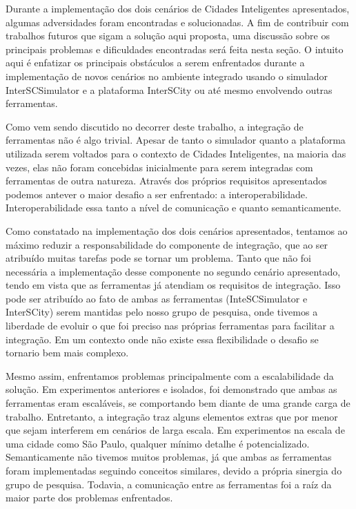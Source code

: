 Durante a implementação dos dois cenários de Cidades Inteligentes apresentados, algumas adversidades foram encontradas e solucionadas.
A fim de contribuir com trabalhos futuros que sigam a solução aqui proposta, uma discussão sobre os principais problemas e dificuldades encontradas será feita
nesta seção.
O intuito aqui é enfatizar os principais obstáculos a serem enfrentados durante a implementação de novos cenários no ambiente integrado usando o simulador InterSCSimulator e
a plataforma InterSCity ou até mesmo envolvendo outras ferramentas.

Como vem sendo discutido no decorrer deste trabalho, a integração de ferramentas não é algo trivial.
Apesar de tanto o simulador quanto a plataforma utilizada serem voltados para o contexto de Cidades Inteligentes, na maioria das vezes, elas não foram concebidas inicialmente
para serem integradas com ferramentas de outra natureza.
Através dos próprios requisitos apresentados podemos antever o maior desafio a ser enfrentado: a interoperabilidade.
Interoperabilidade essa tanto a nível de comunicação e quanto semanticamente.

Como constatado na implementação dos dois cenários apresentados, tentamos ao máximo reduzir a responsabilidade do componente de integração, que ao ser atribuído muitas
tarefas pode se tornar um problema.
Tanto que não foi necessária a implementação desse componente no segundo cenário apresentado, tendo em vista que as ferramentas já atendiam os requisitos de integração.
Isso pode ser atribuído ao fato de ambas as ferramentas (InteSCSimulator e InterSCity) serem mantidas pelo nosso grupo de pesquisa, onde tivemos a liberdade de evoluir o
que foi preciso nas próprias ferramentas para facilitar a integração.
Em um contexto onde não existe essa flexibilidade o desafio se tornario bem mais complexo.

Mesmo assim, enfrentamos problemas principalmente com a escalabilidade da solução.
Em experimentos anteriores e isolados, foi demonstrado que ambas as ferramentas eram escaláveis, se comportando bem diante de uma grande carga de trabalho.
Entretanto, a integração traz alguns elementos extras que por menor que sejam interferem em cenários de larga escala.
Em experimentos na escala de uma cidade como São Paulo, qualquer mínimo detalhe é potencializado.
Semanticamente não tivemos muitos problemas, já que ambas as ferramentas foram implementadas seguindo conceitos similares, devido a própria sinergia do grupo de
pesquisa.
Todavia, a comunicação entre as ferramentas foi a raíz da maior parte dos problemas enfrentados.

